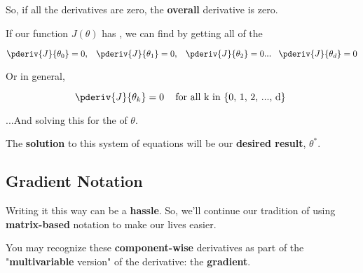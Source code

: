         So, if all the derivatives are zero, the \textbf{overall} derivative is zero.
        \\
        
        \begin{concept}
            If our function $J(\theta)$ has   , we can  find  by getting all of the 
            
            \begin{equation*}
                \pderiv{J}{\theta_0} = 0, \;\;\;
                \pderiv{J}{\theta_1} = 0, \;\;\;
                \pderiv{J}{\theta_2} = 0... \;\;\;
                \pderiv{J}{\theta_d} = 0
            \end{equation*}
            
            Or in general, 
            
            \begin{equation*}
                \pderiv{J}{\theta_k} = 0 \;\;\; \text{ for all k in \{0, 1, 2, ..., d\} }
            \end{equation*}
            
            ...And solving this  for the  of $\theta$.
            
        \end{concept}
        
        
        The \textbf{solution} to this system of equations will be our \textbf{desired result}, $\theta^*$.
        
    \subsection*{Gradient Notation}
    
        Writing it this way can be a \textbf{hassle}. So, we'll continue our tradition of using \textbf{matrix-based} notation to make our lives easier.
        
        You may recognize these \textbf{component-wise} derivatives as part of the "\textbf{multivariable} version" of the derivative: the \textbf{gradient}.\\
        
